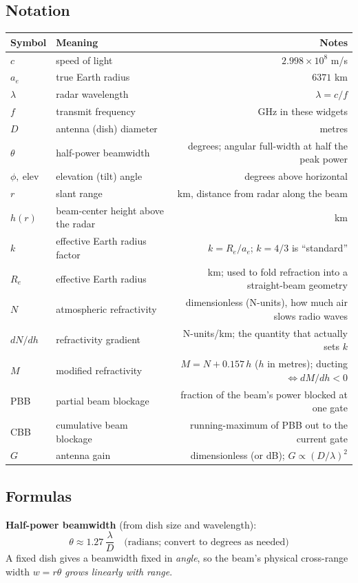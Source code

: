 \documentclass[11pt]{article}
\begin{document}
\subsection{Notation}
\begin{longtable}{L M N}
\toprule
Symbol & Meaning & Notes \\
\midrule
\endhead
$c$ & speed of light & $2.998\times10^{8}$ m/s \\
$a_e$ & true Earth radius & $6371$ km \\
$\lambda$ & radar wavelength & $\lambda = c/f$ \\
$f$ & transmit frequency & GHz in these widgets \\
$D$ & antenna (dish) diameter & metres \\
$\theta$ & half-power beamwidth & degrees; angular full-width at half the peak power \\
$\phi,\ \mathrm{elev}$ & elevation (tilt) angle & degrees above horizontal \\
$r$ & slant range & km, distance from radar along the beam \\
$h(r)$ & beam-center height above the radar & km \\
$k$ & effective Earth radius factor & $k = R_e/a_e$; $k=4/3$ is ``standard'' \\
$R_e$ & effective Earth radius & km; used to fold refraction into a straight-beam geometry \\
$N$ & atmospheric refractivity & dimensionless (N-units), how much air slows radio waves \\
$dN/dh$ & refractivity gradient & N-units/km; the quantity that actually sets $k$ \\
$M$ & modified refractivity & $M = N + 0.157\,h$ ($h$ in metres); ducting $\iff dM/dh<0$ \\
PBB & partial beam blockage & fraction of the beam's power blocked at one gate \\
CBB & cumulative beam blockage & running-maximum of PBB out to the current gate \\
$G$ & antenna gain & dimensionless (or dB); $G\propto (D/\lambda)^2$ \\
\bottomrule
\end{longtable}

\subsection{Formulas}

\textbf{Half-power beamwidth} (from dish size and wavelength):
\begin{equation}
\theta \approx 1.27\,\frac{\lambda}{D}\quad\text{(radians; convert to degrees as needed)}
\end{equation}
A fixed dish gives a beamwidth fixed in \emph{angle}, so the beam's physical cross-range width $w = r\theta$ \emph{grows linearly with range}.
\end{document}
